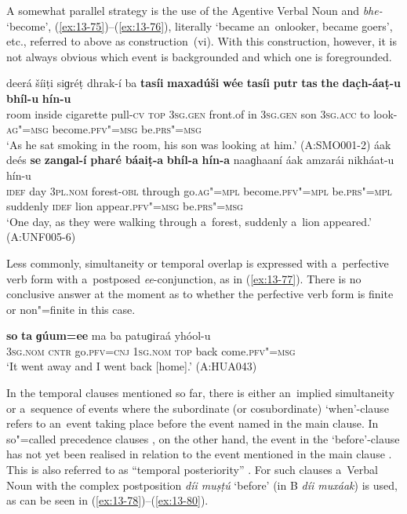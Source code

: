 A somewhat parallel strategy is the use of the Agentive Verbal Noun and \textit{bhe-} `become', (\ref{ex:13-75})--(\ref{ex:13-76}), literally `became an~onlooker, became goers', etc., referred to above as construction~(vi). With this construction, however, it is not always obvious which event is backgrounded and which one is foregrounded. 

\ea
\label{ex:13-75}
\gll deerá šíiṭi siɡréṭ dhrak-í ba \textbf{tasíi} \textbf{maxadúši} \textbf{wée} \textbf{tasíi} \textbf{putr} \textbf{tas} \textbf{the} \textbf{dac̣h-áaṭ-u} \textbf{bhíl-u} \textbf{hín-u} \\
room inside cigarette pull-\textsc{cv} \textsc{top} \textsc{3sg.gen} front.of in \textsc{3sg.gen}  son \textsc{3sg.acc} to look-\textsc{ag"=msg} become.\textsc{pfv"=msg} be.\textsc{prs"=msg}  \\
\glt `As he sat smoking in the room, his son was looking at him.' (A:SMO001-2)
\ex
\label{ex:13-76}
\gll áak deés \textbf{se} \textbf{zanɡal-í} \textbf{pharé} \textbf{báaiṭ-a} \textbf{bhíl-a} \textbf{hín-a} naaɡhaaní áak amzarái nikháat-u hín-u \\
\textsc{idef} day \textsc{3pl.nom} forest-\textsc{obl} through go.\textsc{ag"=mpl}  become.\textsc{pfv"=mpl} be.\textsc{prs"=mpl} suddenly \textsc{idef} lion appear.\textsc{pfv"=msg} be.\textsc{prs"=msg}  \\
\glt `One day, as they were walking through a~forest, suddenly a~lion appeared.' (A:UNF005-6) 
\z

Less commonly, simultaneity or temporal overlap is expressed with a~perfective verb form with a~postposed \textit{ee}-conjunction, as in (\ref{ex:13-77}). There is no conclusive answer at the moment as to whether the perfective verb form is finite or non"=finite in this case.

\begin{exe}
\ex
\label{ex:13-77}
\gll \textbf{so} \textbf{ta} \textbf{ɡúum=ee} ma ba patuɡiraá yhóol-u \\
\textsc{3sg.nom} \textsc{cntr} go.\textsc{pfv=cnj} \textsc{1sg.nom} \textsc{top} back  come.\textsc{pfv"=msg} \\
\glt `It went away and I went back [home].' (A:HUA043) 
\end{exe}

 In the temporal clauses mentioned so far, there is either an~implied simultaneity or a~sequence of events where the subordinate (or cosubordinate) `when'-clause refers to an~event taking place before the event named in the main clause. In so"=called precedence clauses \citep[327]{givon2001b}, on the other hand, the event in the `before'-clause has not yet been realised in relation to the event mentioned in the main clause \citep[247--248]{thompsonetal2007}. This is also referred to as ``temporal posteriority'' \citep[159]{cristofaro2005}. For such clauses a~Verbal Noun with the complex postposition \textit{díi muṣṭú} `before' (in B \textit{díi muxáak}) is used, as can be seen in (\ref{ex:13-78})--(\ref{ex:13-80}).

